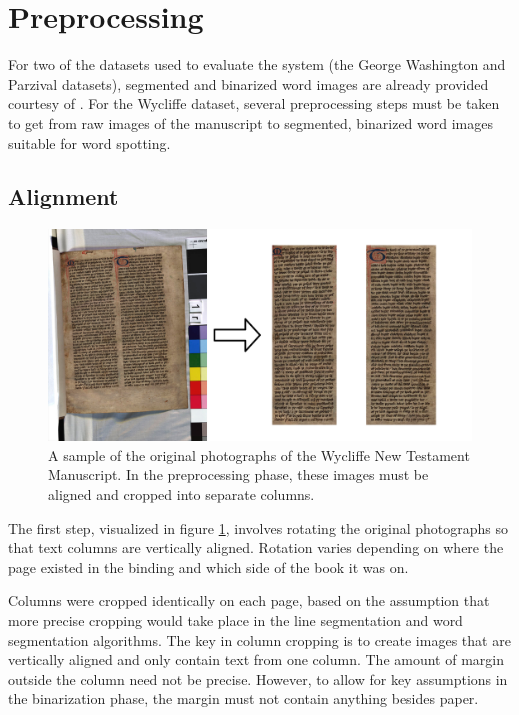 \documentclass[final]{ukthesis}
\begin{document}
%
%
\section{Preprocessing}
For two of the datasets used to evaluate the system (the George Washington and Parzival datasets), segmented and binarized word images are already provided courtesy of \cite{fischer2012lexicon}. For the Wycliffe dataset, several preprocessing steps must be taken to get from raw images of the manuscript to segmented, binarized word images suitable for word spotting.


\subsection{Alignment}

\begin{figure}[t]
\begin{center}
\includegraphics[width=12cm]{rotate-crop}
\end{center}
\caption{A sample of the original photographs of the Wycliffe New Testament Manuscript. In the preprocessing phase, these images must be aligned and cropped into separate columns.}
\label{fig:rotate-crop}
\end{figure}
The first step, visualized in figure \ref{fig:rotate-crop}, involves rotating the original photographs so that text columns are vertically aligned. Rotation varies depending on where the page existed in the binding and which side of the book it was on.

Columns were cropped identically on each page, based on the assumption that more precise cropping would take place in the line segmentation and word segmentation algorithms. The key in column cropping is to create images that are vertically aligned and only contain text from one column. The amount of margin outside the column need not be precise. However, to allow for key assumptions in the binarization phase, the margin must not contain anything besides paper.
\end{document}
